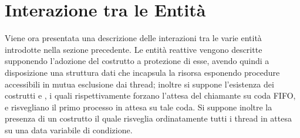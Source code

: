 \section{Interazione tra le Entità}

Viene ora presentata una descrizione delle interazioni tra le varie entità introdotte nella sezione precedente. Le entità reattive vengono descritte supponendo l'adozione del costrutto  a protezione di esse, avendo quindi a disposizione una struttura dati che incapsula la risorsa esponendo procedure accessibili in mutua esclusione dai thread; inoltre si suppone l'esistenza dei costrutti  e , i quali rispettivamente forzano l'attesa del chiamante su coda FIFO, e risvegliano il primo processo in attesa su tale coda. Si suppone inoltre la presenza di un costrutto  il quale risveglia ordinatamente tutti i thread in attesa su una data variabile di condizione.







